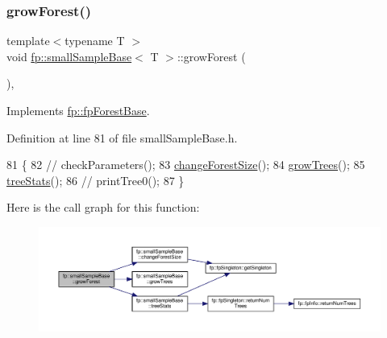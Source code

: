 \subsubsection{\texorpdfstring{grow\+Forest()}{growForest()}}
{\footnotesize\ttfamily template$<$typename T $>$ \\
void \hyperlink{classfp_1_1smallSampleBase}{fp\+::small\+Sample\+Base}$<$ T $>$\+::grow\+Forest (\begin{DoxyParamCaption}{ }\end{DoxyParamCaption})\hspace{0.3cm}{\ttfamily [inline]}, {\ttfamily [virtual]}}



Implements \hyperlink{classfp_1_1fpForestBase_a05b1d924a559536083ee7a8cf3ea542d}{fp\+::fp\+Forest\+Base}.



Definition at line 81 of file small\+Sample\+Base.\+h.


\begin{DoxyCode}
81                              \{
82                 \textcolor{comment}{//  checkParameters();}
83                 \hyperlink{classfp_1_1smallSampleBase_a92cbc7c3e09718ebe0704fbb16e44653}{changeForestSize}();
84                 \hyperlink{classfp_1_1smallSampleBase_a68653c8bb30ad84acc2f9c4b29c85d2e}{growTrees}();
85                 \hyperlink{classfp_1_1smallSampleBase_acc948b260715a190675a5d5ebedf0429}{treeStats}();
86                 \textcolor{comment}{//  printTree0();}
87             \}
\end{DoxyCode}
Here is the call graph for this function\+:
\nopagebreak
\begin{figure}[H]
\begin{center}
\leavevmode
\includegraphics[width=350pt]{classfp_1_1smallSampleBase_a8c5b6a0f2c8aeb32a322cc5e237c60af_cgraph}
\end{center}
\end{figure}
\mbox{\label{classfp_1_1smallSampleBase_a68653c8bb30ad84acc2f9c4b29c85d2e}} 
